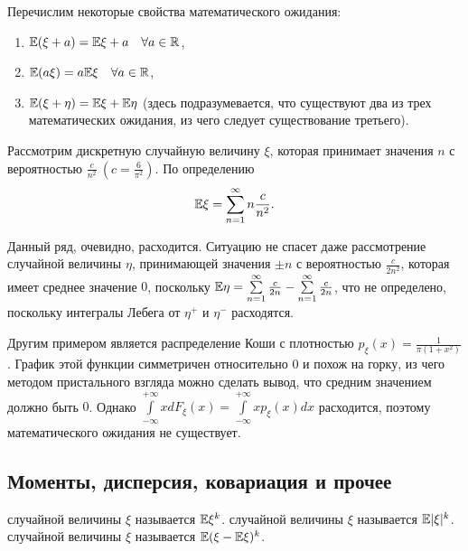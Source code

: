 \documentclass[../TV&MS.tex]{subfiles}
\begin{document}
Перечислим некоторые свойства математического ожидания:
\begin{enumerate}
	\item $\mathbb{E}(\xi + a) = \mathbb{E}\xi + a \quad \forall a \in \mathbb{R}$,
	\item $\mathbb{E}(a\xi) = a\mathbb{E}\xi \quad \forall a \in \mathbb{R}$,
	\item $\mathbb{E}(\xi + \eta) = \mathbb{E}\xi + \mathbb{E}\eta$ (здесь 
	подразумевается, что существуют два из трех математических ожидания, 
	из чего следует существование третьего).
\end{enumerate}

\begin{Ex}
Рассмотрим дискретную случайную величину $\xi$, которая принимает значения $n$ 
с вероятностью $\frac{c}{n^2} \ (c = \frac{6}{\pi^2})$. По определению
$$ \mathbb{E}\xi = \sum\limits_{n=1}^{\infty} n \frac{c}{n^2}.$$

Данный ряд, очевидно, расходится. Ситуацию не спасет даже рассмотрение случайной 
величины $\eta$, принимающей значения $\pm n$ с вероятностью $\frac{c}{2n^2}$, 
которая имеет среднее значение $0$, поскольку $\mathbb{E}\eta = 
\sum\limits_{n=1}^{\infty} \frac{c}{2n} - \sum\limits_{n=1}^{\infty} \frac{c}{2n}$, 
что не определено, поскольку интегралы Лебега от $\eta^+$ и $\eta^-$ расходятся.
\end{Ex}

\begin{Ex}
Другим примером является распределение Коши с плотностью $p_\xi(x) = \frac{1}{\pi(1+x^2)}$. 
График этой функции симметричен относительно $0$ и похож на горку, из чего методом 
пристального взгляда можно сделать вывод, что средним значением должно быть $0$. 
Однако $\int\limits_{-\infty}^{+\infty} x dF_\xi(x) =  \int\limits_{-\infty}^{+\infty} 
x p_\xi(x)dx$ расходится, поэтому математического ожидания не существует.
\end{Ex}

\subsection{Моменты, дисперсия, ковариация и прочее}

\begin{Def}
	 случайной величины $\xi$ называется $\mathbb{E}\xi^k$.
	 случайной величины $\xi$ называется $\mathbb{E}|\xi|^k$.
	 случайной величины 
	$\xi$ называется $\mathbb{E}(\xi - \mathbb{E}\xi)^k$.
\end{Def}
\end{document}
